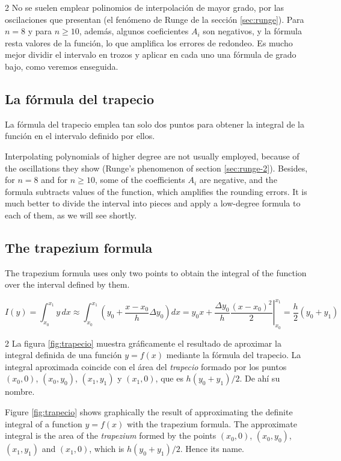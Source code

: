 \begin{paracol}{2}
No se suelen emplear polinomios de interpolación de mayor grado, por las oscilaciones que presentan (el fenómeno de Runge de la sección \ref{sec:runge}). Para $n=8$ y para $n\geq 10$, además, algunos coeficientes $A_i$ son negativos, y la fórmula resta valores de la función, lo que amplifica los errores de redondeo. Es mucho mejor dividir el intervalo en trozos y aplicar en cada uno una fórmula de grado bajo, como veremos enseguida.

\subsection{La fórmula del trapecio}

La fórmula del trapecio emplea tan solo dos puntos para obtener la integral de la función en el intervalo definido por ellos. 

\switchcolumn
Interpolating polynomials of higher degree are not usually employed, because of the oscillations they show (Runge's phenomenon of section \ref{sec:runge-2}). Besides, for $n=8$ and for $n\geq 10$, some of the coefficients $A_i$ are negative, and the formula subtracts values of the function, which amplifies the rounding errors. It is much better to divide the interval into pieces and apply a low-degree formula to each of them, as we will see shortly.

\subsection{The trapezium formula}

The trapezium formula uses only two points to obtain the integral of the function over the interval defined by them. 
\end{paracol}
\begin{equation*}
I(y)=\int_{x_0}^{x_1}y\,dx \approx \int_{x_0}^{x_1}\left(y_0+\frac{x-x_0}{h}\Delta y_0\right)dx =\left. y_0x+ \frac{\Delta y_0}{h}\frac{(x-x_0)^2}{2} \right\rvert_{x_0}^{x_1}=\frac{h}{2}(y_0+y_1)
\end{equation*}
\begin{paracol}{2}
La figura \ref{fig:trapecio} muestra gráficamente el resultado de aproximar la integral definida de una función $y=f(x)$ mediante la fórmula del trapecio. La integral aproximada coincide con el área del \emph{trapecio} formado por los puntos $(x_0,0)$, $(x_0,y_0)$, $(x_1,y_1)$ y $(x_1,0)$, que es $h(y_0+y_1)/2$. De ahí su nombre.

\switchcolumn
Figure \ref{fig:trapecio} shows graphically the result of approximating the definite integral of a function $y = f(x)$ with the trapezium formula. The approximate integral is the area of the \emph{trapezium} formed by the points $(x_0,0)$, $(x_0,y_0)$, $(x_1,y_1)$ and $(x_1,0)$, which is $h(y_0+y_1)/2$. Hence its name.
\end{paracol}
